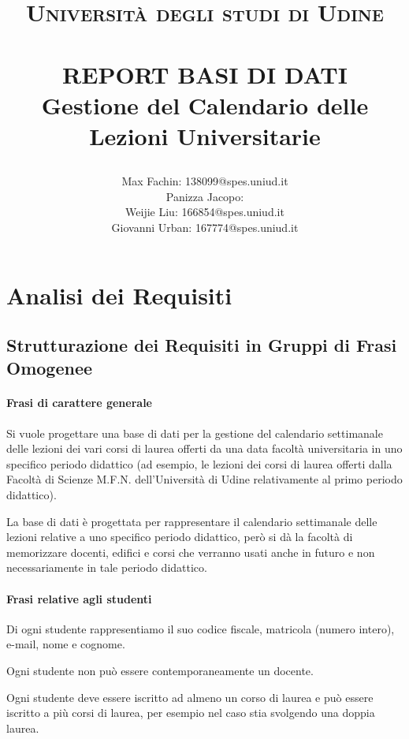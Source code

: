 \documentclass[a4paper,11pt]{article}
\title{
    \normalfont \normalsize 

    \textsc{Università degli studi di Udine} \\ [25pt]
    \horrule{0.5pt} \\[0.5cm]
    \huge REPORT BASI DI DATI \\[0.5cm]
    \large Gestione del Calendario delle Lezioni Universitarie
    \horrule{0.5pt} \\[0.5cm]
}
\begin{document}
\author{Max Fachin: 138099@spes.uniud.it \\ 
Panizza Jacopo: \\ 
Weijie Liu: 166854@spes.uniud.it\\ 
Giovanni Urban: 167774@spes.uniud.it}

\maketitle
\tableofcontents
\newpage

\section{Analisi dei Requisiti}
\subsection{Strutturazione dei Requisiti in Gruppi di Frasi Omogenee}


\paragraph{Frasi di carattere generale}

Si vuole progettare una base di dati per la gestione del calendario settimanale delle lezioni dei vari corsi di laurea offerti da una data facoltà universitaria in uno specifico periodo didattico (ad esempio, le lezioni dei corsi di laurea offerti dalla Facoltà di Scienze M.F.N. dell'Università di Udine relativamente al primo periodo didattico).

La base di dati è progettata per rappresentare il calendario settimanale delle lezioni relative a uno specifico periodo didattico, però si dà la facoltà di memorizzare docenti, edifici e corsi che verranno usati anche in futuro e non necessariamente in tale periodo didattico.


\paragraph{Frasi relative agli studenti}

Di ogni studente rappresentiamo il suo codice fiscale, matricola (numero intero), e-mail, nome e cognome.

Ogni studente non può essere contemporaneamente un docente.

Ogni studente deve essere iscritto ad almeno un corso di laurea e può essere iscritto a più corsi di laurea, per esempio nel caso stia svolgendo una doppia laurea.
\end{document}
